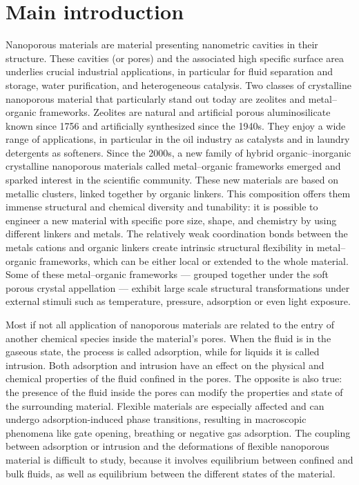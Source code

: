 
\chapter*{Main introduction}

Nanoporous materials are material presenting nanometric cavities in their
structure. These cavities (or pores) and the associated high specific surface
area underlies crucial industrial applications, in particular for fluid
separation and storage, water purification, and heterogeneous catalysis. Two
classes of crystalline nanoporous material that particularly stand out today are
zeolites and metal--organic frameworks. Zeolites are natural and artificial
porous aluminosilicate known since 1756 and artificially synthesized since the
1940s. They enjoy a wide range of applications, in particular in the oil
industry as catalysts and in laundry detergents as softeners. Since the 2000s, a
new family of hybrid organic--inorganic crystalline nanoporous materials called
metal--organic frameworks emerged and sparked interest in the scientific
community. These new materials are based on metallic clusters, linked together
by organic linkers. This composition offers them immense structural and chemical
diversity and tunability: it is possible to engineer a new material with
specific pore size, shape, and chemistry by using different linkers and metals.
The relatively weak coordination bonds between the metals cations and organic
linkers create intrinsic structural flexibility in metal--organic frameworks,
which can be either local or extended to the whole material. Some of these
metal--organic frameworks --- grouped together under the soft porous crystal
appellation --- exhibit large scale structural transformations under external
stimuli such as temperature, pressure, adsorption or even light exposure.

Most if not all application of nanoporous materials are related to the entry of
another chemical species inside the material's pores. When the fluid is in the
gaseous state, the process is called adsorption, while for liquids it is called
intrusion. Both adsorption and intrusion have an effect on the physical and
chemical properties of the fluid confined in the pores. The opposite is also
true: the presence of the fluid inside the pores can modify the properties and
state of the surrounding material. Flexible materials are especially affected
and can undergo adsorption-induced phase transitions, resulting in macroscopic
phenomena like gate opening, breathing or negative gas adsorption. The coupling
between adsorption or intrusion and the deformations of flexible nanoporous
material is difficult to study, because it involves equilibrium between confined
and bulk fluids, as well as equilibrium between the different states of the
material.

